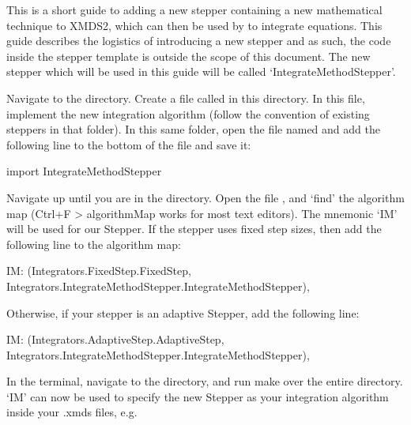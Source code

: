 \documentclass[letterpaper,10pt,english]{sphinxmanual}
\begin{document}
\sphinxAtStartPar
This is a short guide to adding a new stepper containing a new mathematical technique to XMDS2, which can then be used by to integrate equations. This guide describes the logistics of introducing a new stepper and as such, the code inside the stepper template is outside the scope of this document. The new stepper which will be used in this guide will be called ‘IntegrateMethodStepper’.

\sphinxAtStartPar
Navigate to the  directory. Create a file called  in this directory. In this file, implement the new integration algorithm (follow the convention of existing steppers in that folder). In this same folder, open the file named  and add the following line to the bottom of the file and save it:

\begin{sphinxVerbatim}[commandchars=\\\{\}]
import IntegrateMethodStepper
\end{sphinxVerbatim}

\sphinxAtStartPar
Navigate up until you are in the  directory. Open the file , and ‘find’ the algorithm map (Ctrl+F \textgreater{} algorithmMap works for most text editors). The mnemonic ‘IM’ will be used for our Stepper. If the stepper uses fixed step sizes, then add the following line to the algorithm map:

\begin{sphinxVerbatim}[commandchars=\\\{\}]
\PYGZsq{}IM\PYGZsq{}:   (Integrators.FixedStep.FixedStep, Integrators.IntegrateMethodStepper.IntegrateMethodStepper),
\end{sphinxVerbatim}

\sphinxAtStartPar
Otherwise, if your stepper is an adaptive Stepper, add the following line:

\begin{sphinxVerbatim}[commandchars=\\\{\}]
\PYGZsq{}IM\PYGZsq{}:   (Integrators.AdaptiveStep.AdaptiveStep, Integrators.IntegrateMethodStepper.IntegrateMethodStepper),
\end{sphinxVerbatim}

\sphinxAtStartPar
In the terminal, navigate to the  directory, and run make over the entire directory. ‘IM’ can now be used to specify the new Stepper as your integration algorithm inside your .xmds files, e.g.
\end{document}
